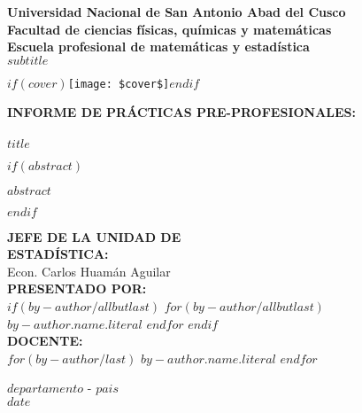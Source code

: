 \thispagestyle{empty}
\hspace{0.075\textwidth} 
\begin{minipage}[b][\textheight][s]{0.85\textwidth}

\centering
\textbf{\large{Universidad Nacional de San Antonio Abad del Cusco}} \\
\textbf{\large{Facultad de ciencias físicas, químicas y matemáticas}} \\
\textbf{\large{Escuela profesional de matemáticas y estadística}} \\
\textbf{\large{$subtitle$}} \\ %
\vspace{1\baselineskip}

$if(cover)$\texttt{[image: \$cover\$]}$endif$
\vspace{1\baselineskip}

\Large{\textbf{INFORME DE PRÁCTICAS PRE-PROFESIONALES:}} \\
\hrulefill \\
{\Large\bfseries{$title$}} \\
\hrulefill 

$if(abstract)$%
\begin{flushright}%
{{$abstract$}}\\[4\baselineskip]%
\end{flushright}%
$endif$

\large{
\flushleft \hspace{6cm}
\textbf{JEFE DE LA UNIDAD DE} \\\hspace{6cm}
\textbf{ESTADÍSTICA:} \\
\hspace{6cm} Econ. Carlos Huamán Aguilar \\ 
\smallskip
\hspace{6cm} \textbf{PRESENTADO POR:} \\ \hspace{6cm}
$if(by-author/allbutlast)$
$for(by-author/allbutlast)$
 {\large{$by-author.name.literal$}}
$endfor$
$endif$
\\
\smallskip
\hspace{6cm} \textbf{DOCENTE:} \\ \hspace{6cm}
$for(by-author/last)$%
{\large{$by-author.name.literal$}}%
$endfor$
}

\vfill

\centering
\Large{$departamento$ - $pais$} \\
\Large{$date$}
\vspace{0.1\textheight} 
\end{minipage}

